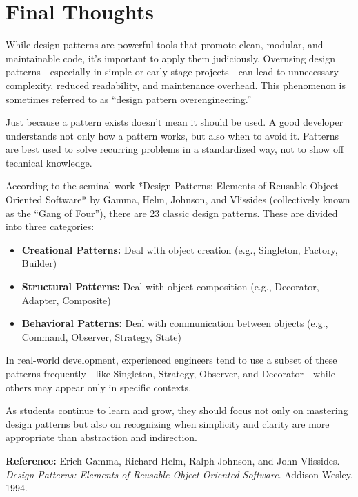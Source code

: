 \documentclass[12pt]{article}
\begin{document}
\section*{Final Thoughts}

While design patterns are powerful tools that promote clean, modular, and maintainable code, it's important to apply them judiciously. Overusing design patterns—especially in simple or early-stage projects—can lead to unnecessary complexity, reduced readability, and maintenance overhead. This phenomenon is sometimes referred to as “design pattern overengineering.”

Just because a pattern exists doesn't mean it should be used. A good developer understands not only how a pattern works, but also when to avoid it. Patterns are best used to solve recurring problems in a standardized way, not to show off technical knowledge.

According to the seminal work *Design Patterns: Elements of Reusable Object-Oriented Software* by Gamma, Helm, Johnson, and Vlissides (collectively known as the “Gang of Four”), there are 23 classic design patterns. These are divided into three categories:

\begin{itemize}
    \item \textbf{Creational Patterns:} Deal with object creation (e.g., Singleton, Factory, Builder)
    \item \textbf{Structural Patterns:} Deal with object composition (e.g., Decorator, Adapter, Composite)
    \item \textbf{Behavioral Patterns:} Deal with communication between objects (e.g., Command, Observer, Strategy, State)
\end{itemize}

In real-world development, experienced engineers tend to use a subset of these patterns frequently—like Singleton, Strategy, Observer, and Decorator—while others may appear only in specific contexts.

As students continue to learn and grow, they should focus not only on mastering design patterns but also on recognizing when simplicity and clarity are more appropriate than abstraction and indirection.

\bigskip
\noindent\textbf{Reference:} Erich Gamma, Richard Helm, Ralph Johnson, and John Vlissides. \textit{Design Patterns: Elements of Reusable Object-Oriented Software}. Addison-Wesley, 1994.
\end{document}
